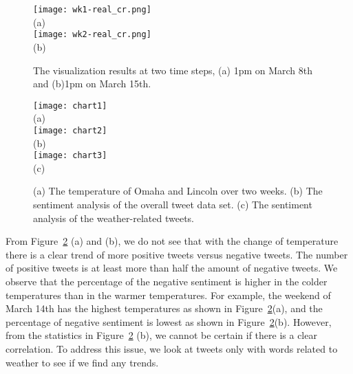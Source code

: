 \begin{figure}[t]
\begin{center}
\texttt{[image: wk1-real\_cr.png]} \\
\mbox{\small{(a)}}\\
\texttt{[image: wk2-real\_cr.png]} \\
\mbox{\small{(b)}}
\end{center}
\vspace{-.1in}
\caption{The visualization results at two time steps, (a) 1pm on March 8th and (b)1pm on March 15th.}
\label{fig:cities}
\end{figure}

\begin{figure}[t]
\begin{center}
\texttt{[image: chart1]} \\
\mbox{\small{(a)}}\\
\texttt{[image: chart2]} \\
\mbox{\small{(b)}}\\
\texttt{[image: chart3]} \\
\mbox{\small{(c)}}
\end{center}
\vspace{-.1in}
\caption{(a) The temperature of Omaha and Lincoln over two weeks. (b) The sentiment analysis of the overall tweet data set. (c) The sentiment analysis of the weather-related tweets.}
\label{fig:chart_1}
\end{figure}

From Figure~\ref{fig:chart_1} (a) and (b), we do not see that with the change of temperature there is a clear trend of more positive tweets versus negative tweets. The number of positive tweets is at least more than half the amount of negative tweets. We observe that the percentage of the negative sentiment is higher in the colder temperatures than in the warmer temperatures. For example, the weekend of March 14th has the highest temperatures as shown in Figure~\ref{fig:chart_1}(a), and the percentage of negative sentiment is lowest as shown in Figure~\ref{fig:chart_1}(b). However, from the statistics in Figure~\ref{fig:chart_1} (b), we cannot be certain if there is a clear correlation. To address this issue, we look at tweets only with words related to weather to see if we find any trends.

